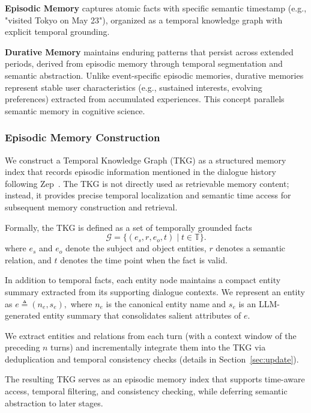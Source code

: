 \documentclass[11pt]{article}
\begin{document}
\noindent\textbf{Episodic Memory} captures atomic facts with specific semantic timestamp (e.g., "visited Tokyo on May 23"), organized as a temporal knowledge graph with explicit temporal grounding.

\noindent\textbf{Durative Memory} maintains enduring patterns that persist across extended periods, derived from episodic memory through temporal segmentation and semantic abstraction. Unlike event-specific episodic memories, durative memories represent stable user characteristics (e.g., sustained interests, evolving preferences) extracted from accumulated experiences. This concept parallels semantic memory in cognitive science.

\subsubsection{Episodic Memory Construction}

We construct a Temporal Knowledge Graph (TKG) as a structured memory index that records episodic information mentioned in the dialogue history following Zep~\cite{rasmussen_zep_2025-1}. The TKG is not directly used as retrievable memory content; instead, it provides precise temporal localization and semantic time access for subsequent memory construction and retrieval.

Formally, the TKG is defined as a set of temporally grounded facts
\begin{equation}
\mathcal{G} = \{ (e_s, r, e_o, t) \mid t \in \mathbb{T} \}.
\end{equation}
where $e_s$ and $e_o$ denote the subject and object entities, $r$ denotes a semantic relation, and $t$ denotes the time point when the fact is valid.

In addition to temporal facts, each entity node maintains a compact entity summary extracted from its supporting dialogue contexts. We represent an entity as $e \triangleq (n_e, s_e),$ where $n_e$ is the canonical entity name and $s_e$ is an LLM-generated entity summary that consolidates salient attributes of $e$.

We extract entities and relations from each turn (with a context window of the preceding $n$ turns) and incrementally integrate them into the TKG via deduplication and temporal consistency checks (details in Section~\ref{sec:update}).

The resulting TKG serves as an episodic memory index that supports time-aware access, temporal filtering, and consistency checking, while deferring semantic abstraction to later stages.
\end{document}
